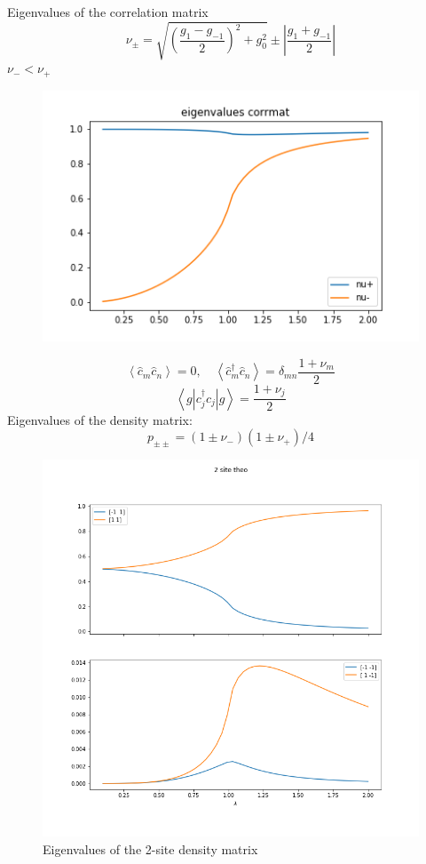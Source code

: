 \documentclass[12pt,a4paper]{report}
\begin{document}
Eigenvalues of the correlation matrix
\begin{equation}
	\nu_{\pm}=\sqrt{\left(\frac{g_{1}-g_{-1}}{2}\right)^{2}+g_{0}^{2}} \pm \left| \frac{g_{1}+g_{-1}}{2} \right|
\end{equation}
$\nu_-<\nu_+$\\
\begin{figure}[h]
	\centering
	\includegraphics[width=0.7\linewidth]{nuplot}
	\caption{}
	\label{fig:nuplot}
\end{figure}
\begin{equation}
	\left\langle\hat{c}_{m} \hat{c}_{n}\right\rangle=0, \quad\left\langle\hat{c}_{m}^{\dagger} \hat{c}_{n}\right\rangle=\delta_{m n} \frac{1+\nu_{m}}{2}
\end{equation}
\begin{equation}
	\left\langle g\left|c_{j}^{\dagger} c_{j}\right| g\right\rangle=\frac{1+\nu_{j}}{2}
\end{equation}
Eigenvalues of the density matrix:
\begin{equation}
	p_{\pm \pm } =(1 \pm \nu_-)(1 \pm \nu_+)/4
\end{equation}
\begin{figure}[h]
	\centering
	\includegraphics[width=0.7\linewidth]{two_site_theo}
	\caption{Eigenvalues of the 2-site density matrix}
	\label{fig:twositetheo}
\end{figure}
\end{document}
